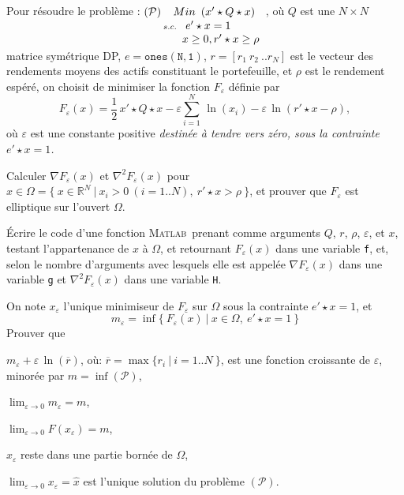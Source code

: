 \documentclass[12pt,a4paper,fleqn]{report}
\newcommand{\matlab}{\textsc{Matlab}}
\newcommand{\R}{\mathbb R}
\newcommand{\grad}{\nabla}
\newcommand{\hess}{\nabla^2}
\newcommand{\on}{\begin{displaymath}}
\newcommand{\off}{\end{displaymath}}
\renewcommand{\P}{\mathcal P}
\newcommand{\push}[1]{\rule{0pt}{0pt}\hspace{#1pt}}
\begin{document}
\begin{exercice}
Pour r\'esoudre le probl\`eme :
\mbox{$ (\P) \push{2} \underset{s. c.\push{3}\begin{array}[t]{l} e'\star x=1\\ \push{-3}x\geq 0, r'\star x\geq \rho\end{array}}%
{Min\push{5} (x'\star Q\star x)}$}, o\`u $Q$ est une $N\times N$ matrice sym\'etrique DP, $e= \mathtt{ones(N,1)}$,
$r=[r_1\ r_2\ .. r_N]$ est le vecteur des rendements moyens des actifs constituant le portefeuille, et $\rho$ est le rendement esp\'er\'e, on choisit de minimiser la fonction $F_{\varepsilon}$ d\'efinie par
\on F_{\varepsilon}(x)=\frac{1}{2}\,x'\star Q\star x -\varepsilon\sum_{i=1}^N\,\ln (x_i) -\varepsilon\,\ln (r'\star x-\rho), \off
o\`u $\varepsilon$ est une constante positive \it destin\'ee \`a tendre vers z\'ero\rm, sous la contrainte $e'\star x=1$.
\begin{questions}
\item Calculer $\grad F_{\varepsilon}(x)$ et $\hess F_{\varepsilon}(x)$ pour $x \in \Omega= \{\ x \in \R^N\ |\ x_i > 0\ (i=1..N), \ r' \star x > \rho\ \}$, et prouver que $F_{\varepsilon}$ est elliptique sur l'ouvert $\Omega$.
\item \'Ecrire le code d'une fonction \matlab\ prenant comme arguments $Q$, $r$, $\rho$, $\varepsilon$, et $x$, testant l'appartenance de $x$ \`a $\Omega$, et retournant $F_{\varepsilon}(x)$ dans une variable \texttt{f}, et, selon le nombre d'arguments avec lesquels elle est appel\'ee $\grad F_{\varepsilon}(x)$ dans une variable \texttt{g} et $\hess F_{\varepsilon}(x)$ dans une variable \texttt{H}.
\item On note $x_{\varepsilon}$ l'unique minimiseur de $F_{\varepsilon}$ sur $\Omega$ sous la contrainte $e'\star x=1$, et \on m_{\varepsilon}=\inf \{ \ F_{\varepsilon}(x)\ |\ x\in \Omega,\ e'\star x=1\ \} \off
Prouver que
\begin{subquestions}
\item $m_{\varepsilon} + \varepsilon\,\ln (\overline r)$, o\`u: $\overline r=\max \{r_i\ |\ i=1..N\ \}$, est une fonction croissante de $\varepsilon$, minor\'ee par $m=\inf (\P)$,
\item $\lim_{\varepsilon\rightarrow 0} m_{\varepsilon}=m$,
\item $\lim_{\varepsilon\rightarrow 0} F(x_{\varepsilon})=m$,
\item $x_\varepsilon$ reste dans une partie born\'ee de $\Omega$,
\item $\lim_{\varepsilon\rightarrow 0} x_{\varepsilon}=\hat x$ est l'unique solution du probl\`eme $(\P)$.

\end{subquestions}
\end{questions}
\end{exercice}
\end{document}
